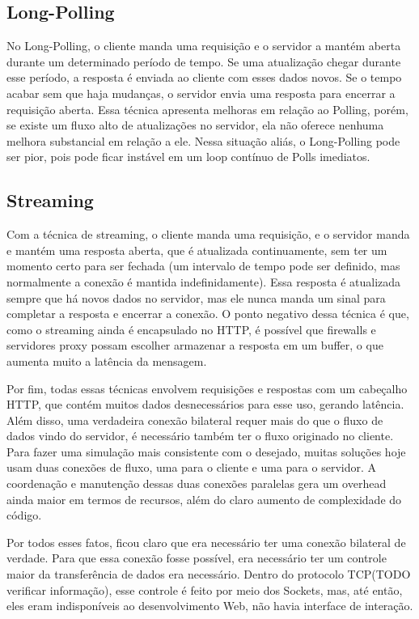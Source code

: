\documentclass[a4paper,12pt]{article}
\begin{document}
\subsection{Long-Polling}

No Long-Polling, o cliente manda uma requisição e o servidor a mantém aberta durante um determinado período de tempo. Se uma atualização chegar durante esse período, a resposta é enviada ao cliente com esses dados novos. Se o tempo acabar sem que haja mudanças, o servidor envia uma resposta para encerrar a requisição aberta. Essa técnica apresenta melhoras em relação ao Polling, porém, se existe um fluxo alto de atualizações no servidor, ela não oferece nenhuma melhora substancial em relação a ele. Nessa situação aliás, o Long-Polling pode ser pior, pois pode ficar instável em um loop contínuo de Polls imediatos.


\subsection{Streaming}

Com a técnica de streaming, o cliente manda uma requisição, e o servidor manda e mantém uma resposta aberta, que é atualizada continuamente, sem ter um momento certo para ser fechada (um intervalo de tempo pode ser definido, mas normalmente a conexão é mantida indefinidamente). Essa resposta é atualizada sempre que há novos dados no servidor, mas ele nunca manda um sinal para completar a resposta e encerrar a conexão. O ponto negativo dessa técnica é que, como o streaming ainda é encapsulado no HTTP, é possível que firewalls e servidores proxy possam escolher armazenar a resposta em um buffer, o que aumenta muito a latência da mensagem.


Por fim, todas essas técnicas envolvem requisições e respostas com um cabeçalho HTTP, que contém muitos dados desnecessários para esse uso, gerando latência. Além disso, uma verdadeira conexão bilateral requer mais do que o fluxo de dados vindo do servidor, é necessário também ter o fluxo originado no cliente. Para fazer uma simulação mais consistente com o desejado, muitas soluções hoje usam duas conexões de fluxo, uma para o cliente e uma para o servidor. A coordenação e manutenção dessas duas conexões paralelas gera um overhead ainda maior em termos de recursos, além do claro aumento de complexidade do código.

Por todos esses fatos, ficou claro que era necessário ter uma conexão bilateral de verdade. Para que essa conexão fosse possível, era necessário ter um controle maior da transferência de dados era necessário. Dentro do protocolo TCP(TODO verificar informação), esse controle é feito por meio dos Sockets, mas, até então, eles eram indisponíveis ao desenvolvimento Web, não havia interface de interação.
\end{document}
